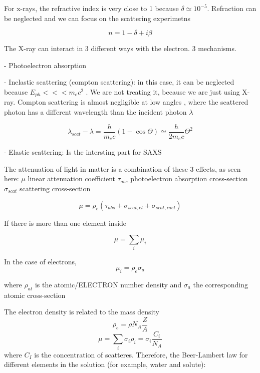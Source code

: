 For x-rays, the refractive index is very close to 1 because $\delta\simeq10^{-5}$. Refraction can be neglected and we can focus on the scattering experimetns

\begin{equation}
        n = 1 - \delta +i \beta
\end{equation}

The X-ray can interact in 3 different ways with the electron. 3 mechanisms.

- Photoelectron absorption

- Inelastic scattering (compton scattering): in this case, it can be neglected because $E_{ph}<<< m_ec^2$ . We are not treating it, because we are just using X-ray. Compton scattering is almost negligible at low angles , where the scattered photon has a different wavelength than the incident photon $\lambda$

\begin{equation}
        \lambda_{scat}-\lambda = \frac{h}{m_e c}\left( 1 - \cos{\Theta} \right) \simeq \frac{h}{2m_e c} \Theta ^ 2
\end{equation}

- Elastic scattering: Is the intersting part for SAXS

The attenuation of light in matter is a combination of these 3 effects, as seen here: $\mu$ linear attenuation coefficient $\tau_{abs}$ photoelectron absorption cross-section $\sigma_{scat}$ scattering cross-section

\begin{equation}
        \mu = \rho_e (\tau_{abs}+\sigma_{scat, el}+\sigma_{scat, inel})
\end{equation}

If there is more than one element inside

\begin{equation}
        \mu = \sum_i \mu_i
\end{equation}

In the case of electrons, 
\begin{equation}
        \mu_i = \rho_{e} \sigma_a
\end{equation}

where $\rho_{at}$ is the atomic/ELECTRON number density and $\sigma_a$ the corresponding atomic cross-section

The electron density is related to the mass density
\begin{equation}
        \rho_e = \rho N_A \frac{Z}{A}
\end{equation}
\begin{equation}
        \mu = \sum_i \sigma_i \rho_i =\sigma_i \frac{C_i}{N_A}
\end{equation}
where $C_I$ is the concentration of scatteres. Therefore, the Beer-Lambert law for different elements in the solution (for example, water and solute):

